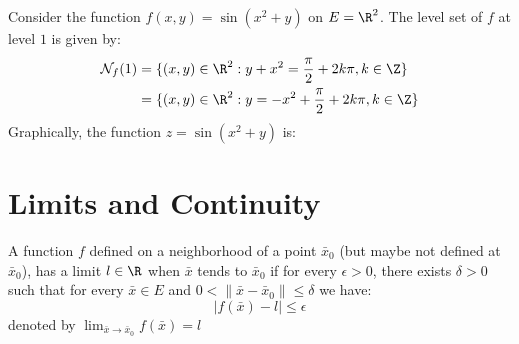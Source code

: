 \begin{eg}
    Consider the function $f(x,y) = \sin (x^2 + y)$ on $E = \R^2$. The level set of $f$ at level $1$ is given by:
    \begin{align*}
        \mathcal{N}_f(1) & = \{(x,y) \in \R^2 : y + x^2 = \frac{\pi}{2} + 2k\pi, k \in \Z\} \\
        &= \{(x,y) \in \R^2 : y = -x^2 + \frac{\pi}{2} + 2k\pi, k \in \Z\}
    \end{align*}
    Graphically, the function $z = \sin(x^2 + y)$ is:
    \begin{center}
    \end{center}
\end{eg}

\section{Limits and Continuity}
\begin{definition}
    A function $f$ defined on a neighborhood of a point $\bar{x}_0$ (but maybe not defined at $\bar{x}_0$), has a limit $l \in \R$ when $\bar{x}$ tends to $\bar{x}_0$ if for every $\epsilon > 0$, there exists $\delta > 0$ such that for every $\bar{x} \in E$ and $0 < \| \bar{x} - \bar{x}_0 \| \leq \delta$ we have:
    \[
        |f(\bar{x}) - l| \leq \epsilon
    \]
    denoted by $\lim_{\bar{x} \to \bar{x}_0} f(\bar{x}) = l$
\end{definition}

